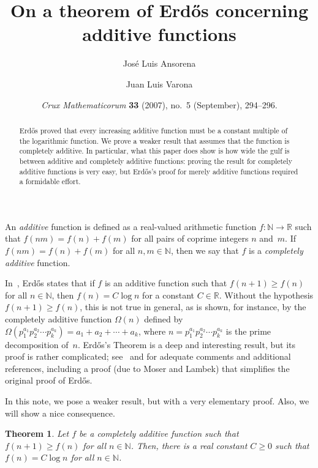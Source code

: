 \documentclass[12pt,a4paper]{amsart}
\title{On a theorem of Erd\H{o}s concerning additive functions}
\author[J. L. Ansorena]{Jos\'e Luis Ansorena}
\author[J. L. Varona]{Juan Luis Varona}
\date{\textit{Crux Mathematicorum} \textbf{33} (2007), no.~5 (September), 294--296.}
\newcommand{\R}{\mathbb{R}}
\newcommand{\N}{\mathbb{N}}
\newtheorem{theorem}{Theorem}
\theoremstyle{remark}
\begin{document}

\begin{abstract}
Erd\H{o}s proved that every increasing additive
function must be a constant multiple of the logarithmic function.
We prove a weaker result that assumes that the function is 
completely additive.
In particular, what this paper does show is how wide the gulf is
between additive and completely additive functions:
proving the result for completely additive functions is very easy,
but Erd\H{o}s's proof for merely additive functions
required a formidable effort.
\end{abstract}

\maketitle

An \textit{additive} function is defined as a real-valued
arithmetic function $f \colon \N \to \R$ such that 
$f(nm) = f(n)+f(m)$ for all pairs of coprime integers $n$ and~$m$.
If $f(nm) = f(n)+f(m)$ for all $n,m \in \N$, then
we say that $f$ is a \textit{completely additive} function.

In~\cite[Theorem~XI, p.~17]{Erdos}, Erd\H{o}s states that
if $f$ is an additive function such that $f(n+1) \ge f(n)$
for all $n \in \N$, then $f(n) = C\log n$ for a constant $C \in \R$.
Without the hypothesis $f(n+1) \ge f(n)$, this is not true in general, as is
shown, for instance, by the completely additive function $\Omega(n)$ defined by
$\Omega(p_1^{a_1} p_2^{a_2} \cdots p_k^{a_k}) = a_1 + a_2 + \cdots + a_k$,
where $n = p_1^{a_1} p_2^{a_2} \cdots p_k^{a_k}$ is the prime decomposition
of~$n$.
Erd\H{o}s's Theorem is a deep and interesting result, but its proof is 
rather complicated; see~\cite[p.~133]{Ruzsa} and 
\cite[\S\,8.33 and 8.34, p.~265 and ff.]{Erdos-Suranyi} 
for adequate comments and additional references, including a proof 
(due to Moser and Lambek) 
that simplifies the original proof of Erd\H{o}s. 

In this note, we pose a weaker result, but with a very elementary proof.
Also, we will show a nice consequence.

\begin{theorem}
\label{th:cadd}
Let $f$ be a completely additive function such that $f(n+1) \ge f(n)$
for all $n \in \N$. Then, there is a real constant $C \ge 0$
such that $f(n) = C\log n$ for all $n \in \N$.
\end{theorem}
\end{document}
